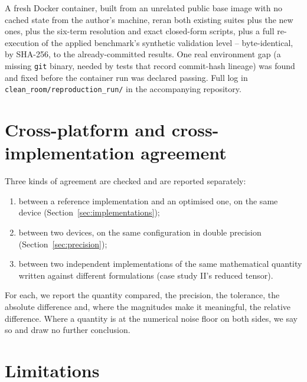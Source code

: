 \documentclass[11pt]{amsart}
\theoremstyle{remark}
\begin{document}
A fresh Docker container, built from an unrelated public base image with no cached state
from the author's machine, reran both existing suites plus the new ones, plus the six-term
resolution and exact closed-form scripts, plus a full re-execution of the applied
benchmark's synthetic validation level -- byte-identical, by SHA-256, to the
already-committed results. One real environment gap (a missing \texttt{git} binary,
needed by tests that record commit-hash lineage) was found and fixed before the container
run was declared passing. Full log in \texttt{clean\_room/reproduction\_run/} in the
accompanying repository.

\section{Cross-platform and cross-implementation agreement}
\label{sec:agreement}

Three kinds of agreement are checked and are reported separately:

\begin{enumerate}[leftmargin=*]
\item between a reference implementation and an optimised one, on the same device
(Section~\ref{sec:implementations});
\item between two devices, on the same configuration in double precision
(Section~\ref{sec:precision});
\item between two independent implementations of the same mathematical quantity written
against different formulations (case study II's reduced tensor).
\end{enumerate}

For each, we report the quantity compared, the precision, the tolerance, the absolute
difference and, where the magnitudes make it meaningful, the relative difference. Where a
quantity is at the numerical noise floor on both sides, we say so and draw no further
conclusion.

\section{Limitations}
\label{sec:limitations}
\end{document}
